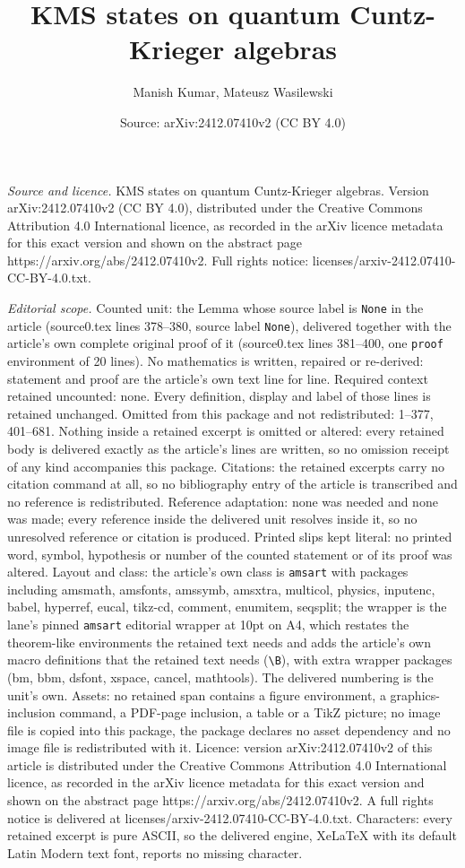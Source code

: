 \documentclass[10pt,a4paper]{amsart}
\title[KMS states on quantum Cuntz-Krieger algebras]{KMS states on quantum Cuntz-Krieger algebras}
\author{Manish Kumar, Mateusz Wasilewski}
\date{Source: arXiv:2412.07410v2 (CC BY 4.0)}
\begin{document}
\maketitle

\noindent\emph{Source and licence.} KMS states on quantum Cuntz-Krieger algebras. Version arXiv:2412.07410v2 (CC BY 4.0), distributed under the Creative Commons Attribution 4.0 International licence, as recorded in the arXiv licence metadata for this exact version and shown on the abstract page https://arxiv.org/abs/2412.07410v2. Full rights notice: licenses/arxiv-2412.07410-CC-BY-4.0.txt.\par\smallskip

\noindent\textit{Editorial scope.} Counted unit: the Lemma whose source label is \texttt{None} in the article (source0.tex lines 378--380, source label \texttt{None}), delivered together with the article's own complete original proof of it (source0.tex lines 381--400, one \texttt{proof} environment of 20 lines). No mathematics is written, repaired or re-derived: statement and proof are the article's own text line for line. Required context retained uncounted: none. Every definition, display and label of those lines is retained unchanged. Omitted from this package and not redistributed: 1--377, 401--681. Nothing inside a retained excerpt is omitted or altered: every retained body is delivered exactly as the article's lines are written, so no omission receipt of any kind accompanies this package. Citations: the retained excerpts carry no citation command at all, so no bibliography entry of the article is transcribed and no reference is redistributed. Reference adaptation: none was needed and none was made; every reference inside the delivered unit resolves inside it, so no unresolved reference or citation is produced. Printed slips kept literal: no printed word, symbol, hypothesis or number of the counted statement or of its proof was altered. Layout and class: the article's own class is \texttt{amsart} with packages including amsmath, amsfonts, amssymb, amsxtra, multicol, physics, inputenc, babel, hyperref, eucal, tikz-cd, comment, enumitem, seqsplit; the wrapper is the lane's pinned \texttt{amsart} editorial wrapper at 10pt on A4, which restates the theorem-like environments the retained text needs and adds the article's own macro definitions that the retained text needs (\texttt{\textbackslash B}), with extra wrapper packages (bm, bbm, dsfont, xspace, cancel, mathtools). The delivered numbering is the unit's own. Assets: no retained span contains a figure environment, a graphics-inclusion command, a PDF-page inclusion, a table or a TikZ picture; no image file is copied into this package, the package declares no asset dependency and no image file is redistributed with it. Licence: version arXiv:2412.07410v2 of this article is distributed under the Creative Commons Attribution 4.0 International licence, as recorded in the arXiv licence metadata for this exact version and shown on the abstract page https://arxiv.org/abs/2412.07410v2. A full rights notice is delivered at licenses/arxiv-2412.07410-CC-BY-4.0.txt. Characters: every retained excerpt is pure ASCII, so the delivered engine, XeLaTeX with its default Latin Modern text font, reports no missing character.
\end{document}
